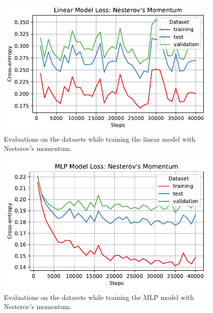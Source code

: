 \documentclass[letterpaper,11pt]{article}
\begin{document}
  \begin{figure}
    \centering
    \includegraphics{problem4/linear_loss_nesterov.pdf}
    \caption{Evaluations on the datasets while training the linear model with
      Nesterov's momentum.}
    \label{fig:linear_loss_nesterov}
  \end{figure}

    \begin{figure}
    \centering
    \includegraphics{problem4/mlp_loss_nesterov.pdf}
    \caption{Evaluations on the datasets while training the MLP model with
      Nesterov's momentum.}
    \label{fig:mlp_loss_nesterov}
  \end{figure}
\end{document}
